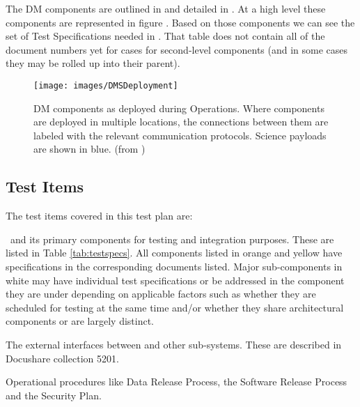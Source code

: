  The DM components are  outlined in  and detailed in . At a high level these components are represented in figure .  Based on those components we can see the set of Test Specifications needed in . That table does not contain all of the document numbers yet for cases for second-level components (and in some cases they may be rolled up into their parent).


\begin{figure}[htbp]
	\begin{center}
		\texttt{[image: images/DMSDeployment]}
		\caption{DM components as deployed during Operations. Where components are
			deployed in multiple locations, the connections between them are labeled with
			the relevant communication protocols. Science payloads are shown in blue.
		\label{fig:dmsdeploy} (from )}
	\end{center}
\end{figure}

\subsection{Test Items}

\begin{table}
	\caption{Components from LDM-148 with the test specifications to verify them. \label{tab:testspecs}}
	
\end{table}

The test items covered in this test plan are:

\begin{itemize_single}
\item \product\ and its primary components for testing and integration purposes. These are listed in Table \ref{tab:testspecs}. All components listed in orange and yellow have specifications in the corresponding documents listed. Major sub-components in white may have individual test specifications or be addressed in the component they are under depending on applicable factors such as whether they are scheduled for testing at the same time and/or whether they share architectural components or are largely distinct.

\item The external interfaces between \product and other sub-systems. These are described in Docushare collection 5201.

\item Operational procedures like Data Release Process, the Software Release Process and the Security Plan.

\end{itemize_single}


